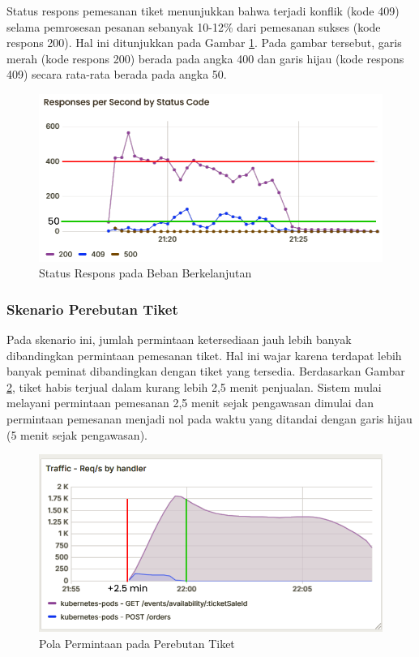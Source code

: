 Status respons pemesanan tiket menunjukkan bahwa terjadi konflik (kode 409) selama pemrosesan pesanan sebanyak 10-12\% dari pemesanan sukses (kode respons 200). Hal ini ditunjukkan pada Gambar \ref{fig:pattern-stress-order}. Pada gambar tersebut, garis merah (kode respons 200) berada pada angka 400 dan garis hijau (kode respons 409) secara rata-rata berada pada angka 50.

\begin{figure}[H]
    \centering
    \includegraphics[width=1\textwidth]{resources/chapter-4/pattern-stress-order.png}
    \caption{Status Respons pada Beban Berkelanjutan}
    \label{fig:pattern-stress-order}
\end{figure}

\subsubsection{Skenario Perebutan Tiket}

Pada skenario ini, jumlah permintaan ketersediaan jauh lebih banyak dibandingkan permintaan pemesanan tiket. Hal ini wajar karena terdapat lebih banyak peminat dibandingkan dengan tiket yang tersedia. Berdasarkan Gambar \ref{fig:pattern-sim-traffic}, tiket habis terjual dalam kurang lebih 2,5 menit penjualan. Sistem mulai melayani permintaan pemesanan 2,5 menit sejak pengawasan dimulai dan permintaan pemesanan menjadi nol pada waktu yang ditandai dengan garis hijau (5 menit sejak pengawasan).

\begin{figure}[H]
    \centering
    \includegraphics[width=1\textwidth]{resources/chapter-4/pattern-sim-traffic.png}
    \caption{Pola Permintaan pada Perebutan Tiket}
    \label{fig:pattern-sim-traffic}
\end{figure}

